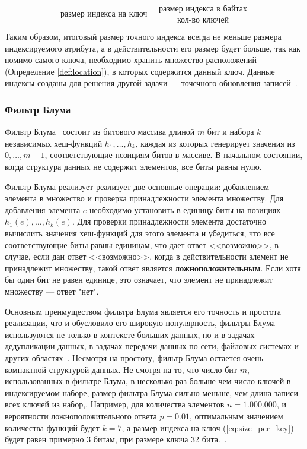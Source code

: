 \begin{equation}\label{eq:size_per_key}
    \textrm{размер индекса на ключ} = \frac{\textrm{размер индекса в байтах}}{\textrm{кол-во ключей}}
\end{equation}

Таким образом, итоговый размер точного индекса всегда не меньше размера индексируемого атрибута, а в действительности его размер будет больше, так как помимо самого ключа, необходимо хранить множество расположений (Определение \ref{def:location}), в которых содержится данный ключ. Данные индексы созданы для решения другой задачи --- точечного обновления записей~\cite{Hudi_RLI}.

\subsubsection{Фильтр Блума} 

Фильтр Блума~\cite{Bloom_Filter} состоит из битового массива длиной $m$ бит и набора $k$ независимых хеш-функций $h_1, \dots, h_k$, каждая из которых генерирует значения из ${0, \dots, m-1}$, соответствующие позициям битов в массиве. В начальном состоянии, когда структура данных не содержит элементов, все биты равны нулю.

Фильтр Блума реализует реализует две основные операции: добавлением элемента в множество и проверка принадлежности элемента множеству. Для добавления элемента $e$ необходимо установить в единицу биты на позициях $h_1(e), \dots, h_k(e)$. Для проверки принадлежности элемента достаточно вычислить значения хеш-функций для этого элемента и убедиться, что все соответствующие биты равны единицам, что дает ответ {<<возможно>>}, в случае, если дан ответ {<<возможно>>}, когда в действительности элемент не принадлежит множеству, такой ответ является \textbf{ложноположительным}. Если хотя бы один бит не равен единице, это означает, что элемент не принадлежит множеству — ответ "нет".

Основным преимуществом фильтра Блума является его точность и простота реализации, что и обусловило его широкую популярность, фильтры Блума используются не только в контексте больших данных, но и в задачах дедупликации данных, в задачах передачи данных по сети, файловых системах и других областях~\cite{Role_of_bloom_filter_in_big_data}. Несмотря на простоту, фильтр Блума остается очень компактной структурой данных. Не смотря на то, что число бит $m$, использованных в фильтре Блума, в несколько раз больше чем число ключей в индексируемом наборе, размер фильтра Блума сильно меньше, чем длина записи всех ключей из набор,. Например, для количества элементов $n = 1.000.000$,  и вероятности ложноположительного ответа $p = 0.01$, оптимальным значением количества функций будет $k = 7$, а размер индекса на ключ (\ref{eq:size_per_key}) будет равен примерно 3 битам, при размере ключа 32 бита.~\cite{Bloom_Filter}.

